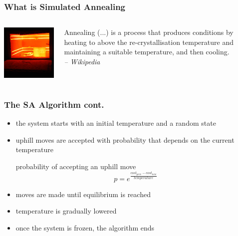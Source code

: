 \documentclass{beamer}
\begin{document}
\begin{frame}
  \frametitle{What is Simulated Annealing}

  \begin{columns}
    \begin{column}{7cm}
      \includegraphics[width=7cm]{furnace.png}
    \end{column}
    \begin{column}{5cm}
      Annealing (...) is a process that produces conditions by heating to above
      the re-crystallisation temperature and maintaining a suitable
      temperature, and then cooling.\\
      \hfill\textit{-- Wikipedia}
    \end{column}
  \end{columns}
\end{frame}

\begin{frame}
  \frametitle{The SA Algorithm cont.}

  \begin{itemize}
  \item the system starts with an initial temperature and a random state
  \item uphill moves are accepted with probability that depends on the current
    temperature
    \begin{block}{probability of accepting an uphill move}
      \begin{equation*}
        p = e^{\frac{cost_{prev} - cost_{new}}{temperature}}
      \end{equation*}
    \end{block}
  \item moves are made until equilibrium is reached
  \item temperature is gradually lowered
  \item once the system is frozen, the algorithm ends
  \end{itemize}

\end{frame}
\end{document}
